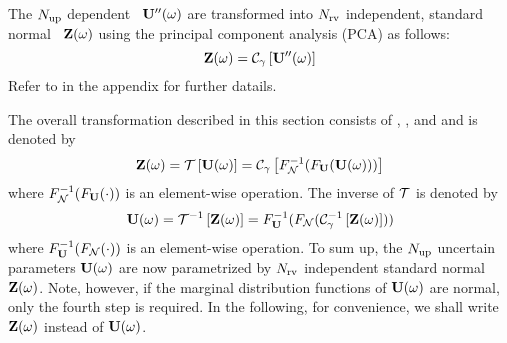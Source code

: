  The ${N_\text{up}}$ dependent \rvs\ $\mathbf{U}''(\omega)$ are transformed into ${N_\text{rv}}$ independent, standard normal \rvs\ $\mathbf{Z}(\omega)$ using the principal component analysis (PCA) as follows:
\begin{equation} \elabel{independent-normal}
  \vZ(\o) = \oPCA{\vU''(\o)}
\end{equation}
Refer to  in the appendix for further datails.

The overall transformation described in this section consists of , , and  and is denoted by
\[
  \vZ(\o) = \oT{\vU(\o)} = \oPCA{\CDF_\normal^{-1}(\CDF_{\vU}(\vU(\o)))}
\]
where $F_{\mathcal{N}}^{-1}(F_{\mathbf{U}}(\cdot))$ is an element-wise operation. The inverse of $\oT$ is denoted by
\[
  \vU(\o) = \oInvT{\vZ(\o)} = \CDF_{\vU}^{-1}(\CDF_\normal(\oInvPCA{\vZ(\o)}))
\]
where $F^{-1}_{\mathbf{U}}(F_{\mathcal{N}}(\cdot))$ is an element-wise operation. To sum up, the ${N_\text{up}}$ uncertain parameters $\mathbf{U}(\omega)$ are now parametrized by ${N_\text{rv}}$ independent standard normal \rvs\ $\mathbf{Z}(\omega)$. Note, however, if the marginal distribution functions of $\mathbf{U}(\omega)$ are normal, only the fourth step is required. In the following, for convenience, we shall write $\mathbf{Z}(\omega)$ instead of $\mathbf{U}(\omega)$.
